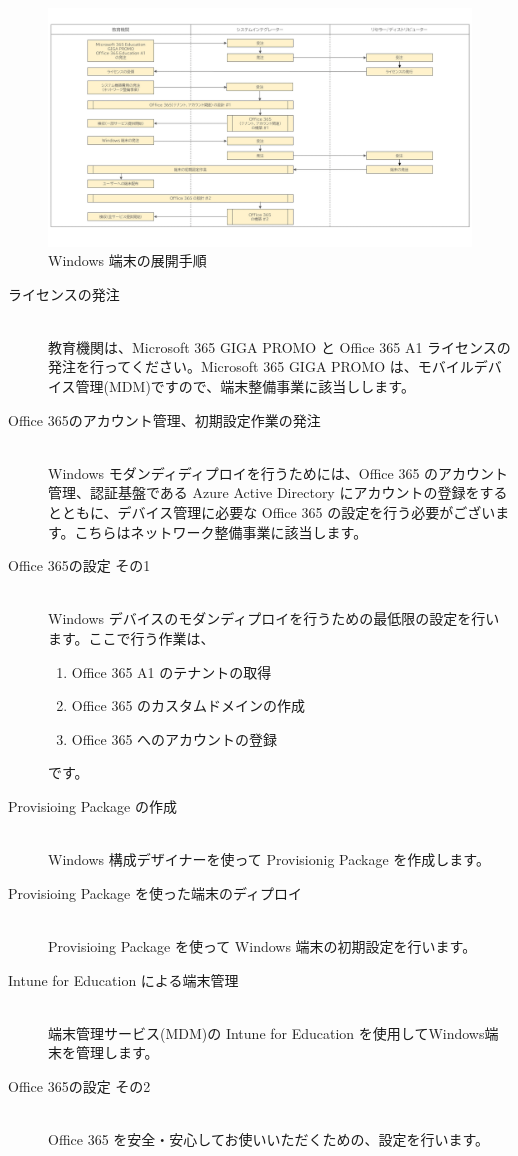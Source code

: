 \begin{figure}[htbp]
    \centering
    \includegraphics[width=17cm]{figures/StepbyStep.png}
    \caption{Windows 端末の展開手順}
    \label{fig:StepbyStep}
    \vspace{15cm}
\end{figure}

\begin{description}
    \item[ライセンスの発注]\mbox{}\\
    教育機関は、Microsoft 365 GIGA PROMO と Office 365 A1 ライセンスの発注を行ってください。Microsoft 365 GIGA PROMO は、モバイルデバイス管理(MDM)ですので、端末整備事業に該当しします。
    \item[Office 365のアカウント管理、初期設定作業の発注]\mbox{}\\
    Windows モダンディディプロイを行うためには、Office 365 のアカウント管理、認証基盤である Azure Active Directory にアカウントの登録をするとともに、デバイス管理に必要な Office 365 の設定を行う必要がございます。こちらはネットワーク整備事業に該当します。
    \item[Office 365の設定 その1]\mbox{}\\
    Windows デバイスのモダンディプロイを行うための最低限の設定を行います。ここで行う作業は、
        \begin{enumerate}
            \item Office 365 A1 のテナントの取得
            \item Office 365 のカスタムドメインの作成
            \item Office 365 へのアカウントの登録
        \end{enumerate}
    です。
    \item[Provisioing Package の作成]\mbox{}\\
    Windows 構成デザイナーを使って Provisionig Package を作成します。
    \item[Provisioing Package を使った端末のディプロイ] \mbox{}\\
    Provisioing Package を使って Windows 端末の初期設定を行います。
    \item[Intune for Education による端末管理] \mbox{}\\
    端末管理サービス(MDM)の Intune for Education を使用してWindows端末を管理します。
    \item[Office 365の設定 その2] \mbox{}\\
    Office 365 を安全・安心してお使いいただくための、設定を行います。
    
\end{description}
